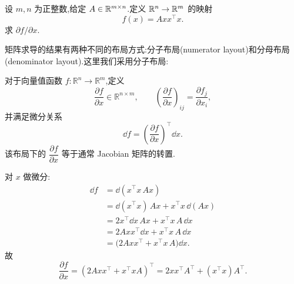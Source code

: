 \begin{problem}
设 $m,n$ 为正整数,给定 $A\in\mathbb{R}^{m\times n}$.定义 $\mathbb{R}^n\to\mathbb{R}^m$ 的映射
\[
f(x)=Axx^\top x.
\]
求 $\partial f/\partial x$.
\begin{solution}

\begin{solnote}
    矩阵求导的结果有两种不同的布局方式:分子布局(numerator layout)和分母布局(denominator layout).这里我们采用分子布局:

对于向量值函数 $f:\mathbb R^n\to\mathbb R^m$,定义
\[
\frac{\partial f}{\partial x}\in\mathbb R^{n\times m},
\qquad
\left(\frac{\partial f}{\partial x}\right)_{ij}
=
\frac{\partial f_j}{\partial x_i},
\]
并满足微分关系
\[
\dd f=\left(\frac{\partial f}{\partial x}\right)^\top \dd x.
\]
该布局下的 $\dfrac{\partial f}{\partial x}$ 等于通常 Jacobian 矩阵的转置.
\end{solnote}

对 $x$ 做微分:
\begin{align*}
\dd f
&=\dd(x^\top x\,Ax)\\
&=\dd(x^\top x)\,Ax+x^\top x\,\dd(Ax)\\
&=2x^\top\dd x\,Ax+x^\top x\,A\,\dd x\\
&=2Axx^\top\dd x+x^\top x\,A\,\dd x\\
&=\bigl(2Axx^\top+x^\top x\,A\bigr)\dd x.
\end{align*}
故
\[
\frac{\partial f}{\partial x}=(2Axx^\top+x^\top xA)^\top = 2xx^\top A^\top+(x^\top x)A^\top.
\]
\end{solution}



\end{problem}

